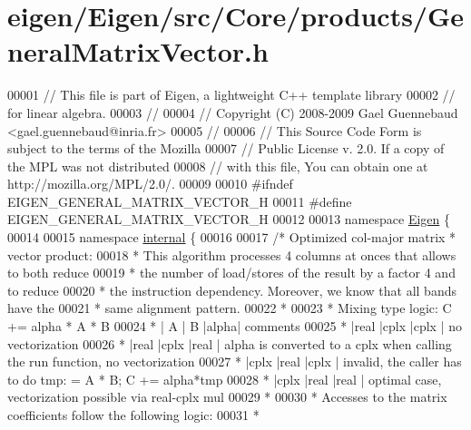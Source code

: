 \hypertarget{eigen_2_eigen_2src_2_core_2products_2_general_matrix_vector_8h_source}{}\section{eigen/\+Eigen/src/\+Core/products/\+General\+Matrix\+Vector.h}
\label{eigen_2_eigen_2src_2_core_2products_2_general_matrix_vector_8h_source}

\begin{DoxyCode}
00001 \textcolor{comment}{// This file is part of Eigen, a lightweight C++ template library}
00002 \textcolor{comment}{// for linear algebra.}
00003 \textcolor{comment}{//}
00004 \textcolor{comment}{// Copyright (C) 2008-2009 Gael Guennebaud <gael.guennebaud@inria.fr>}
00005 \textcolor{comment}{//}
00006 \textcolor{comment}{// This Source Code Form is subject to the terms of the Mozilla}
00007 \textcolor{comment}{// Public License v. 2.0. If a copy of the MPL was not distributed}
00008 \textcolor{comment}{// with this file, You can obtain one at http://mozilla.org/MPL/2.0/.}
00009 
00010 \textcolor{preprocessor}{#ifndef EIGEN\_GENERAL\_MATRIX\_VECTOR\_H}
00011 \textcolor{preprocessor}{#define EIGEN\_GENERAL\_MATRIX\_VECTOR\_H}
00012 
00013 \textcolor{keyword}{namespace }\hyperlink{namespace_eigen}{Eigen} \{
00014 
00015 \textcolor{keyword}{namespace }\hyperlink{namespaceinternal}{internal} \{
00016 
00017 \textcolor{comment}{/* Optimized col-major matrix * vector product:}
00018 \textcolor{comment}{ * This algorithm processes 4 columns at onces that allows to both reduce}
00019 \textcolor{comment}{ * the number of load/stores of the result by a factor 4 and to reduce}
00020 \textcolor{comment}{ * the instruction dependency. Moreover, we know that all bands have the}
00021 \textcolor{comment}{ * same alignment pattern.}
00022 \textcolor{comment}{ *}
00023 \textcolor{comment}{ * Mixing type logic: C += alpha * A * B}
00024 \textcolor{comment}{ *  |  A  |  B  |alpha| comments}
00025 \textcolor{comment}{ *  |real |cplx |cplx | no vectorization}
00026 \textcolor{comment}{ *  |real |cplx |real | alpha is converted to a cplx when calling the run function, no vectorization}
00027 \textcolor{comment}{ *  |cplx |real |cplx | invalid, the caller has to do tmp: = A * B; C += alpha*tmp}
00028 \textcolor{comment}{ *  |cplx |real |real | optimal case, vectorization possible via real-cplx mul}
00029 \textcolor{comment}{ *}
00030 \textcolor{comment}{ * Accesses to the matrix coefficients follow the following logic:}
00031 \textcolor{comment}{ *}

\end{DoxyCode}
